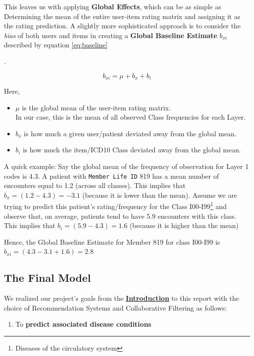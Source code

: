 \documentclass[twoside,11pt]{article}
\newcommand*\circled[1]{\tikz[baseline=(char.base)]{
            \node[shape=circle,draw,inner sep=1pt] (char) {#1};}}
\begin{document}
This leaves us with applying \textbf{Global Effects}, which can be as simple as \circled{1} Determining the mean of the entire user-item rating matrix and \circled{2} assigning it as the rating prediction.
\newpage
A slightly more sophisticated approach is to consider the \textit{bias} of both users and items in creating a \textbf{Global Baseline Estimate} $b_{xi}$ described by equation \ref{eq:baseline}{.

\begin{equation}
  b_{xi} = \mu + b_x + b_i
  \label{eq:baseline}
\end{equation}

Here,
\begin{itemize}
  \item $\mu$ is the global mean of the user-item rating matrix. \\In our case, this is the mean of all observed Class frequencies for each Layer.
  \item $b_x$ is how much a given user/patient deviated away from the global mean.
  \item $b_i$ is how much the item/ICD10 Class deviated away from the global mean.
\end{itemize}

A quick example: Say the global mean of the frequency of observation for Layer 1 codes is 4.3. A patient with \texttt{Member Life ID} 819 has a mean number of encounters equal to 1.2 (across all classes). This implies that $b_x = (1.2 - 4.3) = -3.1$ (because it is lower than the mean). Assume we are trying to predict this patient's rating/frequency for the Class I00-I99\footnote{Diseases of the circulatory system} and observe that, on average,  patients tend to have 5.9 encounters with this class. This implies that $b_i = (5.9 - 4.3) = 1.6$ (because it is higher than the mean)

Hence, the Global Baseline Estimate for Member 819 for class I00-I99 is $b_{xi} = (4.3 - 3.1 + 1.6) = 2.8$


\subsection{The Final Model}

We realized our project's goals from the \hyperref[section:introduction]{\textbf{Introduction}} to this report with the choice of Recommendation Systems and Collaborative Filtering as follows:
\begin{enumerate}
  \item To \textbf{predict associated disease conditions}


\end{enumerate}}
\end{document}
